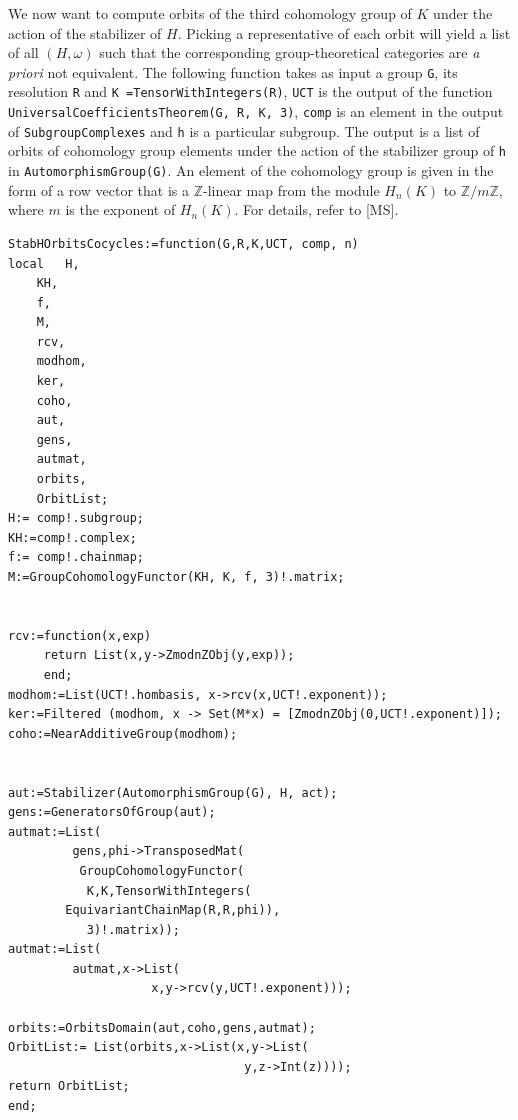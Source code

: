 \documentclass[11pt]{book}
\theoremstyle{Rem}
\theoremstyle{definition}
\numberwithin{equation}{section}
\newcommand\lstl{\lstinline}
\newcommand\ZZ{\mathbb Z}
\begin{document}
We now want to compute orbits of the  third cohomology group of $K$ under the action of the stabilizer of $H$. Picking a representative of each orbit will yield a list of all $(H,\omega)$ such that the corresponding group-theoretical categories are \textit{a priori} not equivalent. The following function takes as input a group \lstinline{G}, its resolution \lstinline{R} and \lstinline{K =TensorWithIntegers(R)}, \lstinline{UCT} is the output of the function \lstinline{UniversalCoefficientsTheorem(G, R, K, 3)}, \lstl{comp} is an element in the output of \lstl{SubgroupComplexes} and \lstl{h} is a particular subgroup. The output is a list of orbits of cohomology group elements under the action of the stabilizer group of \lstinline{h} in \lstinline{AutomorphismGroup(G)}. An element of the cohomology group is given in the form of a row vector that is a $\ZZ$-linear map from the module $H_n(K)$ to $\ZZ/m\ZZ$, where $m$ is the exponent of $H_n(K)$. For details, refer to [MS]. 
\begin{lstlisting}
StabHOrbitsCocycles:=function(G,R,K,UCT, comp, n)
local 	H, 
	KH, 
	f, 
	M, 
	rcv, 
	modhom, 
	ker, 
	coho,
	aut,
	gens,
	autmat,
	orbits, 
	OrbitList;
H:= comp!.subgroup;
KH:=comp!.complex;
f:= comp!.chainmap;
M:=GroupCohomologyFunctor(KH, K, f, 3)!.matrix;


rcv:=function(x,exp) 
     return List(x,y->ZmodnZObj(y,exp));
     end;
modhom:=List(UCT!.hombasis, x->rcv(x,UCT!.exponent));
ker:=Filtered (modhom, x -> Set(M*x) = [ZmodnZObj(0,UCT!.exponent)]);   
coho:=NearAdditiveGroup(modhom);


aut:=Stabilizer(AutomorphismGroup(G), H, act);
gens:=GeneratorsOfGroup(aut);
autmat:=List(
         gens,phi->TransposedMat(
          GroupCohomologyFunctor(
           K,K,TensorWithIntegers(
	    EquivariantChainMap(R,R,phi)),
           3)!.matrix));
autmat:=List(
         autmat,x->List(
                    x,y->rcv(y,UCT!.exponent)));
                  
orbits:=OrbitsDomain(aut,coho,gens,autmat);
OrbitList:= List(orbits,x->List(x,y->List(
                                 y,z->Int(z))));
return OrbitList; 
end;

\end{lstlisting}
\end{document}
